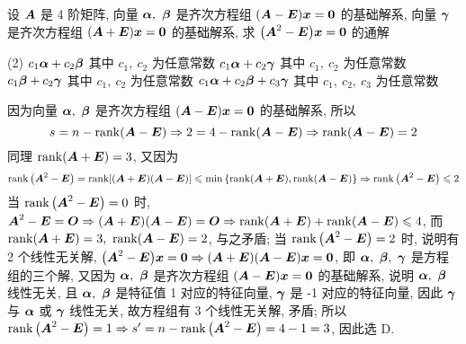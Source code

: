 \begin{example}
    设 $\vb*{A}$ 是 4 阶矩阵, 向量 $\vb*{\alpha},~\vb*{\beta}$ 是齐次方程组 $(\vb*{A}-\vb*{E})\vb*{x}=\vb*{0}$ 的基础解系, 向量 $\vb*{\gamma}$ 是齐次方程组 $(\vb*{A}+\vb*{E})\vb*{x}=\vb*{0}$ 的基础解系, 求 $\qty(\vb*{A}^2-\vb*{E})\vb*{x}=\vb*{0}$ 的通解
    \begin{tasks}(2)
        \task $c_1\vb*{\alpha}+c_2\vb*{\beta}$ 其中 $c_1,~c_2$ 为任意常数
        \task $c_1\vb*{\alpha}+c_2\vb*{\gamma}$ 其中 $c_1,~c_2$ 为任意常数
        \task $c_1\vb*{\beta}+c_2\vb*{\gamma}$ 其中 $c_1,~c_2$ 为任意常数
        \task $c_1\vb*{\alpha}+c_2\vb*{\beta}+c_3\vb*{\gamma}$ 其中 $c_1,~c_2,~c_3$ 为任意常数
    \end{tasks}
\end{example}
\begin{solution}
    因为向量 $\vb*{\alpha},~\vb*{\beta}$ 是齐次方程组 $(\vb*{A}-\vb*{E})\vb*{x}=\vb*{0}$ 的基础解系, 所以 $$s=n-\rank(\vb*{A}-\vb*{E})\Rightarrow 2=4-\rank(\vb*{A}-\vb*{E})\Rightarrow \rank(\vb*{A}-\vb*{E})=2$$
    同理 $\rank(\vb*{A}+\vb*{E})=3$, 又因为 
    $$\rank\qty(\vb*{A}^2-\vb*{E})=\rank[(\vb*{A}+\vb*{E})(\vb*{A}-\vb*{E})]\leqslant \min\qty{\rank(\vb*{A}+\vb*{E}),\rank(\vb*{A}-\vb*{E})}\Rightarrow \rank\qty(\vb*{A}^2-\vb*{E})\leqslant 2$$
    当 $\rank\qty(\vb*{A}^2-\vb*{E})=0$ 时, $\vb*{A}^2-\vb*{E}=\vb*{O}\Rightarrow (\vb*{A}+\vb*{E})(\vb*{A}-\vb*{E})=\vb*{O}\Rightarrow \rank(\vb*{A}+\vb*{E})+\rank(\vb*{A}-\vb*{E})\leqslant 4$, 而 $\rank(\vb*{A}+\vb*{E})=3,~\rank(\vb*{A}-\vb*{E})=2$, 与之矛盾;
    当 $\rank\qty(\vb*{A}^2-\vb*{E})=2$ 时, 说明有 2 个线性无关解, $\qty(\vb*{A}^2-\vb*{E})\vb*{x}=\vb*{0}\Rightarrow (\vb*{A}+\vb*{E})(\vb*{A}-\vb*{E})\vb*{x}=\vb*{0}$, 即 $\vb*{\alpha},~\vb*{\beta},~\vb*{\gamma}$ 是方程组的三个解, 
    又因为 $\vb*{\alpha},~\vb*{\beta}$ 是齐次方程组 $(\vb*{A}-\vb*{E})\vb*{x}=\vb*{0}$ 的基础解系, 说明 $\vb*{\alpha},~\vb*{\beta}$ 线性无关, 且 $\vb*{\alpha},~\vb*{\beta}$ 是特征值 1 对应的特征向量, $\vb*{\gamma}$ 是 -1 对应的特征向量, 因此 $\vb*{\gamma}$ 与 $\vb*{\alpha}$ 或 $\vb*{\gamma}$ 线性无关, 故方程组有 3 个线性无关解, 矛盾;
    所以 $\rank\qty(\vb*{A}^2-\vb*{E})=1\Rightarrow s'=n-\rank\qty(\vb*{A}^2-\vb*{E})=4-1=3$, 因此选 D.
\end{solution}

